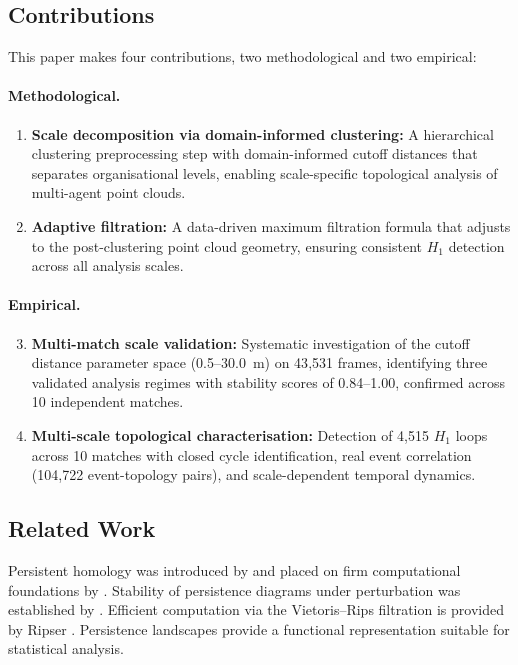 \subsection{Contributions}

This paper makes four contributions, two methodological and two empirical:

\paragraph{Methodological.}
\begin{enumerate}
  \item \textbf{Scale decomposition via domain-informed clustering:} A hierarchical clustering preprocessing step with domain-informed cutoff distances that separates organisational levels, enabling scale-specific topological analysis of multi-agent point clouds.
  \item \textbf{Adaptive filtration:} A data-driven maximum filtration formula that adjusts to the post-clustering point cloud geometry, ensuring consistent \(H_1\) detection across all analysis scales.
\end{enumerate}

\paragraph{Empirical.}
\begin{enumerate}
  \setcounter{enumi}{2}
  \item \textbf{Multi-match scale validation:} Systematic investigation of the cutoff distance parameter space (0.5--30.0~m) on 43{,}531 frames, identifying three validated analysis regimes with stability scores of 0.84--1.00, confirmed across 10 independent matches.
  \item \textbf{Multi-scale topological characterisation:} Detection of 4,515 \(H_1\) loops across 10 matches with closed cycle identification, real event correlation (104,722 event-topology pairs), and scale-dependent temporal dynamics.
\end{enumerate}

\subsection{Related Work}

Persistent homology was introduced by \citet{Edelsbrunner2000} and placed on firm computational foundations by \citet{Zomorodian2005}. Stability of persistence diagrams under perturbation was established by \citet{CohenSteiner2007}. Efficient computation via the Vietoris--Rips filtration is provided by Ripser \citep{Bauer2021}. Persistence landscapes \citep{Bubenik2015} provide a functional representation suitable for statistical analysis.

